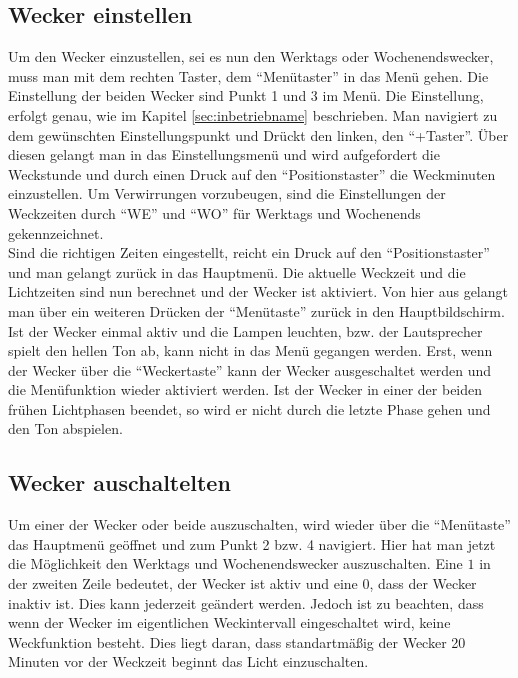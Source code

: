 \documentclass[12pt,a4paper,titlepage,headinclude]{scrartcl}
\numberwithin{equation}{subsection}
\begin{document}
\subsection{Wecker einstellen}
\label{sec:weckereinstellen}
Um den Wecker einzustellen, sei es nun den Werktags oder Wochenendswecker, muss man mit dem rechten Taster, dem "`Menütaster"' in das Menü gehen.
Die Einstellung der beiden Wecker sind Punkt 1 und 3 im Menü.
Die Einstellung, erfolgt genau, wie im Kapitel \ref{sec:inbetriebname} beschrieben.
Man navigiert zu dem gewünschten Einstellungspunkt und Drückt den linken, den "`+Taster"'.
Über diesen gelangt man in das Einstellungsmenü und wird aufgefordert die Weckstunde und durch einen Druck auf den "`Positionstaster"' die Weckminuten einzustellen.
Um Verwirrungen vorzubeugen, sind die Einstellungen der Weckzeiten durch "`WE"' und "`WO"' für Werktags und Wochenends gekennzeichnet.\\
Sind die richtigen Zeiten eingestellt, reicht ein Druck auf den "`Positionstaster"' und man gelangt zurück in das Hauptmenü.
Die aktuelle Weckzeit und die Lichtzeiten sind nun berechnet und der Wecker ist aktiviert.
Von hier aus gelangt man über ein weiteren Drücken der "`Menütaste"' zurück in den Hauptbildschirm.\\
Ist der Wecker einmal aktiv und die Lampen leuchten, bzw. der Lautsprecher spielt den hellen Ton ab, kann nicht in das Menü gegangen werden.
Erst, wenn der Wecker über die "`Weckertaste"' kann der Wecker ausgeschaltet werden und die Menüfunktion wieder aktiviert werden.
Ist der Wecker in einer der beiden frühen Lichtphasen beendet, so wird er nicht durch die letzte Phase gehen und den Ton abspielen.

\subsection{Wecker auschaltelten}
Um einer der Wecker oder beide auszuschalten, wird wieder über die "`Menütaste"' das Hauptmenü geöffnet und zum Punkt 2 bzw. 4 navigiert.
Hier hat man jetzt die Möglichkeit den Werktags und Wochenendswecker auszuschalten.
Eine $1$ in der zweiten Zeile bedeutet, der Wecker ist aktiv und eine $0$, dass der Wecker inaktiv ist.
Dies kann jederzeit geändert werden.
Jedoch ist zu beachten, dass wenn der Wecker im eigentlichen Weckintervall eingeschaltet wird, keine Weckfunktion besteht.
Dies liegt daran, dass standartmäßig der Wecker 20 Minuten vor der Weckzeit beginnt das Licht einzuschalten.
\end{document}
